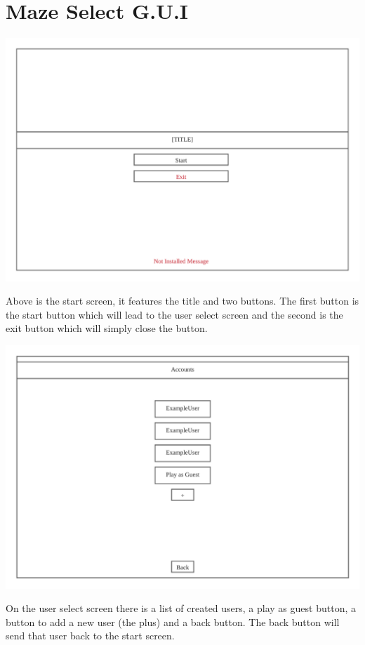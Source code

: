 \documentclass{article}
\begin{document}
\clearpage
\section{Maze Select G.U.I}
\begin{center}
	\includegraphics[scale=0.7]{Start Screen}

	Above is the start screen, it features the title and two buttons. The first button is the start button which will lead to the user select
	screen and the second is the exit button which will simply close the button.
\end{center}
\begin{center}
	\includegraphics[scale=0.7]{User Select Screen}

	On the user select screen there is a list of created users, a play as guest button, a button to add a new user (the plus) and a back button. The back button
	will send that user back to the start screen.
\end{center}
\end{document}
